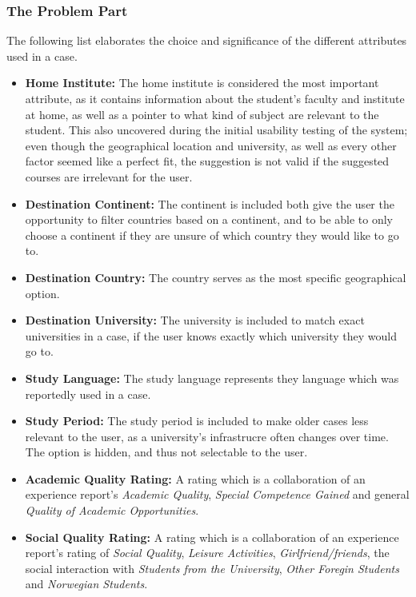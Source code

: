 \subsubsection{The Problem Part}

The following list elaborates the choice and significance of the different attributes used in a case.

\begin{itemize}
\item \textbf{Home Institute:} The home institute is considered the most important attribute, as it contains information about the student's faculty and institute at home, as well as a pointer to what kind of subject are relevant to the student. This also uncovered during the initial usability testing of the system; even though the geographical location and university, as well as every other factor seemed like a perfect fit, the suggestion is not valid if the suggested courses are irrelevant for the user. 

\item \textbf{Destination Continent:} The continent is included both give the user the opportunity to filter countries based on a continent, and to be able to only choose a continent if they are unsure of which country they would like to go to. 

\item \textbf{Destination Country:} The country serves as the most specific geographical option.

\item \textbf{Destination University:} The university is included to match exact universities in a case, if the user knows exactly which university they would go to.

\item \textbf{Study Language:} The study language represents they language which was reportedly used in a case.

\item \textbf{Study Period:} The study period is included to make older cases less relevant to the user, as a university's infrastrucre often changes over time. The option is hidden, and thus not selectable to the user. 

\item \textbf{Academic Quality Rating:} A rating which is a collaboration of an experience report's \emph{Academic Quality}, \emph{Special Competence Gained} and general \emph{Quality of Academic Opportunities}.

\item \textbf{Social Quality Rating:} A rating which is a collaboration of an experience report's rating of  \emph{Social Quality}, \emph{Leisure Activities}, \emph{Girlfriend/friends}, the social interaction with \emph{Students from the University}, \emph{Other Foregin Students} and \emph{Norwegian Students}.


\end{itemize}
